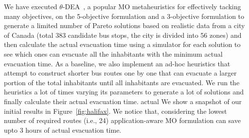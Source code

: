 We have executed $\theta$-DEA~\cite{yuan2015new}, a popular MO metaheuristics for effectively tacking many objectives, on the 5-objective formulation and a 3-objective formulation to generate a limited number of Pareto solutions based on realistic data from a city of Canada (total 383 candidate bus stops, the city is divided into 56 zones) and then calculate the actual evacuation time using a simulator for each solution to see which ones can evacuate all the inhabitants with the minimum actual evacuation time. As a baseline, we also implement an ad-hoc heuristics that attempt to construct shorter bus routes one by one that can evacuate a larger portion of the total inhabitants until all inhabitants are evacuated. We run the heuristics a lot of times varying its parameters to generate a lot of solutions and finally calculate their actual evacuation time. actual We show a snapshot of our initial results in Figure~\ref{fig:halifax}. We notice that,  considering the lowest number of required routes (i.e., 24) application-aware MO formulation can save upto 3 hours of actual evacuation time.

